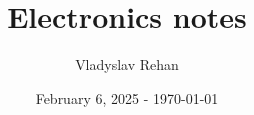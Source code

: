 





\title{Electronics notes}
\date{February 6, 2025 - \today}
\author{Vladyslav Rehan}
\maketitle





\printbibliography



